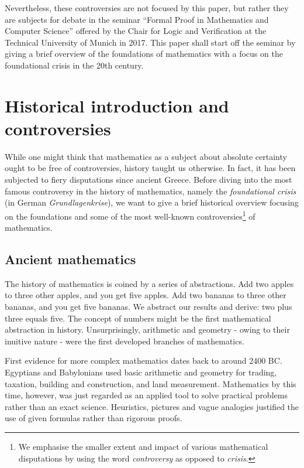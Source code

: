 \documentclass[hidelinks]{article}
\theoremstyle{plain}
\theoremstyle{definition}
\theoremstyle{rem}
\begin{document}
Nevertheless, these controversies are not focused by this paper, but rather they are subjects for debate in the seminar ``Formal Proof in Mathematics and Computer Science'' offered by the Chair for Logic and Verification at the Technical University of Munich in 2017. This paper shall start off the seminar by giving a brief overview of the foundations of mathematics with a focus on the foundational crisis in the 20th century.
\newpage

\tableofcontents 
\newpage

\section{Historical introduction and controversies}
While one might think that mathematics as a subject about absolute certainty ought to be free of controversies, history taught us otherwise. In fact, it has been subjected to fiery disputations since ancient Greece. Before diving into the most famous controversy in the history of mathematics, namely the \textit{foundational crisis} (in German \textit{Grundlagenkrise}), we want to give a brief historical overview focusing on the foundations and some of the most well-known controversies\footnote{We emphasise the smaller extent and impact of various mathematical disputations by using the word \textit{controversy} as opposed to \textit{crisis}.} of mathematics.

\subsection{Ancient mathematics}

The history of mathematics is coined by a series of abstractions.
Add two apples to three other apples, and you get five apples. Add two bananas to three other bananas, and you get five bananas. We abstract our results and derive: two plus three equals five. The concept of numbers might be the first mathematical abstraction in history. Unsurprisingly, arithmetic and geometry - owing to their inuitive nature - were the first developed branches of mathematics.

First evidence for more complex mathematics dates back to around 2400 BC\@. Egyptians and Babylonians used basic arithmetic and geometry for trading, taxation, building and construction, and land measurement. Mathematics by this time, however, was just regarded as an applied tool to solve practical problems rather than an exact science. Heuristics, pictures and vague analogies justified the use of given formulas rather than rigorous proofs.
\end{document}
